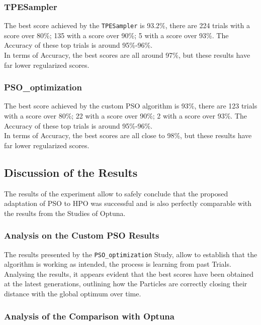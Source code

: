 \subsubsection{TPESampler}

The best score achieved by the \texttt{TPESampler} is 93.2\%, there are 224 trials with a score over 80\%; 135 with a score over 90\%; 5 with a score over 93\%. The Accuracy of these top trials is around 95\%-96\%.
\\[0.3cm]In terms of Accuracy, the best scores are all around 97\%, but these results have far lower regularized scores.

\subsubsection{PSO\_optimization}

The best score achieved by the custom PSO algorithm is 93\%, there are 123 trials with a score over 80\%; 22 with a score over 90\%; 2 with a score over 93\%. The Accuracy of these top trials is around 95\%-96\%.
\\[0.3cm]In terms of Accuracy, the best scores are all close to 98\%, but these results have far lower regularized scores.

\subsection{Discussion of the Results}

The results of the experiment allow to safely conclude that the proposed adaptation of PSO to HPO was successful and is also perfectly comparable with the results from the Studies of Optuna.

\subsubsection{Analysis on the Custom PSO Results}

The results presented by the \texttt{PSO\_optimization} Study, allow to establish that the algorithm is working as intended, the process is learning from past Trials.
Analysing the results, it appears evident that the best scores have been obtained at the latest generations, outlining how the Particles are correctly closing their distance with the global optimum over time.

\subsubsection{Analysis of the Comparison with Optuna}


